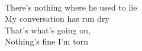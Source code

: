 \\
There's nothing where he used to lie\\
My conversation has run dry \\
That's what's going on, \\
Nothing's fine I'm torn \\
